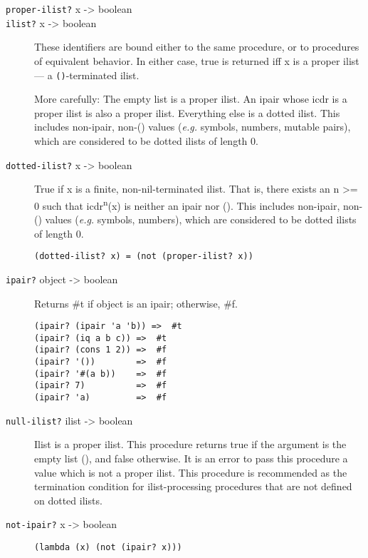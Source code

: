 \begin{description}
\item[ \texttt{proper-ilist?} x -\textgreater{} boolean \href{}{}\\
\texttt{ilist?} x -\textgreater{} boolean \href{}{} ]
These identifiers are bound either to the same procedure, or to
procedures of equivalent behavior. In either case, true is returned iff
x is a proper ilist --- a \texttt{()}-terminated ilist.

More carefully: The empty list is a proper ilist. An ipair whose icdr is
a proper ilist is also a proper ilist. Everything else is a dotted
ilist. This includes non-ipair, non-() values (\emph{e.g.} symbols,
numbers, mutable pairs), which are considered to be dotted ilists of
length 0.

\href{}{}
\item[\texttt{dotted-ilist?} x -\textgreater{} boolean ]
True if x is a finite, non-nil-terminated ilist. That is, there exists
an n \textgreater{}= 0 such that icdr\textsuperscript{n}(x) is neither
an ipair nor (). This includes non-ipair, non-() values (\emph{e.g.}
symbols, numbers), which are considered to be dotted ilists of length 0.

\begin{verbatim}
(dotted-ilist? x) = (not (proper-ilist? x))
\end{verbatim}

\href{}{}
\item[\texttt{ipair?} object -\textgreater{} boolean ]
Returns \#t if object is an ipair; otherwise, \#f.

\begin{verbatim}
(ipair? (ipair 'a 'b)) =>  #t
(ipair? (iq a b c)) =>  #t
(ipair? (cons 1 2)) =>  #f
(ipair? '())        =>  #f
(ipair? '#(a b))    =>  #f
(ipair? 7)          =>  #f
(ipair? 'a)         =>  #f
\end{verbatim}

\href{}{}
\item[\texttt{null-ilist?} ilist -\textgreater{} boolean ]
Ilist is a proper ilist. This procedure returns true if the argument is
the empty list (), and false otherwise. It is an error to pass this
procedure a value which is not a proper ilist. This procedure is
recommended as the termination condition for ilist-processing procedures
that are not defined on dotted ilists.
\item[ \href{}{} \texttt{not-ipair?} x -\textgreater{} boolean ]
\begin{verbatim}
(lambda (x) (not (ipair? x)))
\end{verbatim}


\end{description}
